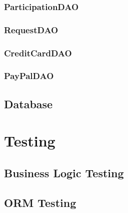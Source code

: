 \documentclass[11pt]{article}
\begin{document}
            \subsubsection{ParticipationDAO} \label{subsubsec:participation-dao}

            \subsubsection{RequestDAO} \label{subsubsec:request-dao}

            \subsubsection{CreditCardDAO} \label{subsubsec:credit-card-dao}

            \subsubsection{PayPalDAO} \label{subsubsec:paypal-dao}

        \subsection{Database} \label{subsec:database}

    \section{Testing} \label{sec:testing}

        \subsection{Business Logic Testing} \label{subsec:business-logic-testing}

        \subsection{ORM Testing} \label{subsec:orm-testing}
\end{document}
